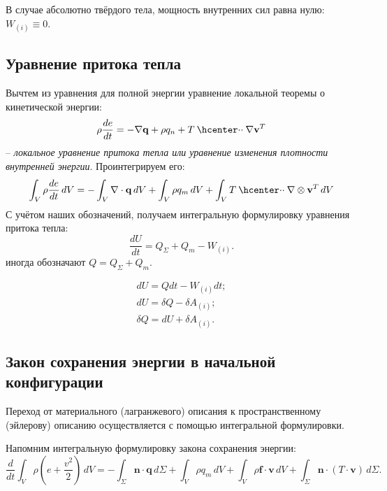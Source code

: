 В случае абсолютно твёрдого тела, мощность внутренних сил равна нулю: $W_{(i)} \equiv 0$.



\subsection{Уравнение притока тепла}

Вычтем из уравнения для полной энергии уравнение локальной теоремы о кинетической энергии:
\[
  \rho \dfrac{de}{dt} = - \nabla \mathbf{q} + \rho q_n + T \cddot \nabla \mathbf{v}^T
\]
-- \emph{локальное уравнение притока тепла или уравнение изменения плотности внутренней энергии}.
Проинтегрируем его:
\[
  \int_V \rho \dfrac{de}{dt} \, dV = - \int_V \nabla \cdot \mathbf{q} \, dV + \int_V \rho q_m \, dV
  + \int_V T \cddot \nabla \otimes \mathbf{v}^T \, dV
\]
С учётом наших обозначений, получаем интегральную формулировку уравнения притока тепла:
\[
  \dfrac{dU}{dt} = Q_\Sigma + Q_m - W_{(i)}.
\]
иногда обозначают $Q = Q_\Sigma + Q_m$.

\begin{align*}
  dU = Q dt - W_{(i)} dt; \\
  dU = \delta Q - \delta A_{(i)}; \\
  \delta Q = dU + \delta A_{(i)}.
\end{align*}


\subsection{Закон сохранения энергии в начальной конфигурации}

Переход от материального (лагранжевого) описания к пространственному (эйлерову) описанию
осуществляется с помощью интегральной формулировки.

Напомним интегральную формулировку закона сохранения энергии:
\[
  \dfrac{d}{dt} \int_V \rho \left( e + \dfrac{v^2}{2} \right) \, dV
  = - \int_\Sigma \mathbf{n} \cdot \mathbf{q} \, d\Sigma
  + \int_V \rho q_m \, dV
  + \int_V \rho \mathbf{f} \cdot \mathbf{v} \, dV
  + \int_\Sigma \mathbf{n} \cdot \left( T \cdot \mathbf{v} \right) \, d\Sigma.
\]

